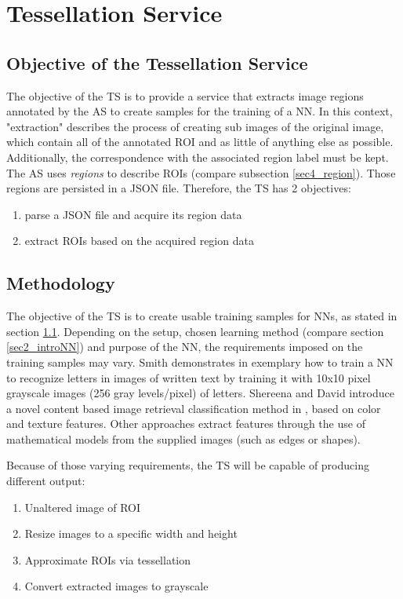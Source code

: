 \chapter{Tessellation Service}
\label{sec5}
\section{Objective of the Tessellation Service}
\label{sec5_objective}
The objective of the TS is to provide a service that extracts image regions annotated by the AS to create samples for the training of a NN. In this context, "extraction" describes the process of creating sub images of the original image, which contain all of the annotated ROI and as little of anything else as possible. Additionally, the correspondence with the associated region label must be kept. The AS uses \emph{regions} to describe ROIs (compare subsection \ref{sec4_region}). Those regions are persisted in a JSON file. Therefore, the TS has 2 objectives:
\begin{enumerate}[(1)]
	\item parse a JSON file and acquire its region data
	\item extract ROIs based on the acquired region data
\end{enumerate}


\section{Methodology}
\label{sec5_method}
The objective of the TS is to create usable training samples for NNs, as stated in section \ref{sec5_objective}. Depending on the setup, chosen learning method (compare section \ref{sec2_introNN}) and purpose of the NN, the requirements imposed on the training samples may vary. Smith demonstrates in \cite{Smith97} exemplary how to train a NN to recognize letters in images of written text by training it with 10x10 pixel grayscale images (256 gray levels/pixel) of letters. Shereena and David introduce a novel content based image retrieval classification method in \cite{Shereena14}, based on color and texture features. Other approaches extract features through the use of mathematical models from the supplied images (such as edges or shapes)\cite{Harvey91}.

Because of those varying requirements, the TS will be capable of producing different output:
\begin{enumerate}[(1)]
	\item Unaltered image of ROI
	\item Resize images to a specific width and height
	\item Approximate ROIs via tessellation
	\item Convert extracted images to grayscale
\end{enumerate}

